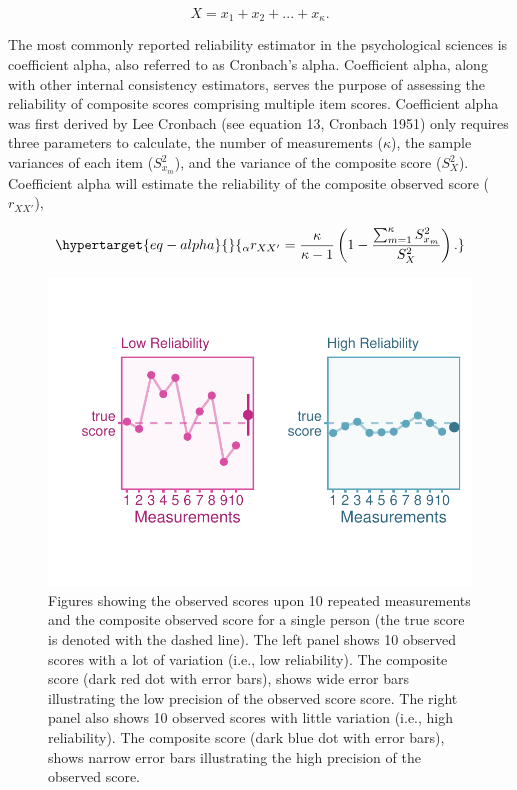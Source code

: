 \documentclass[
  letterpaper,
  DIV=11,
  numbers=noendperiod]{scrreprt}
\begin{document}
\[
X = x_1 + x_2 +...+x_\kappa.
\]

The most commonly reported reliability estimator in the psychological
sciences is coefficient alpha, also referred to as Cronbach's alpha.
Coefficient alpha, along with other internal consistency estimators,
serves the purpose of assessing the reliability of composite scores
comprising multiple item scores. Coefficient alpha was first derived by
Lee Cronbach (see equation 13, Cronbach 1951) only requires three
parameters to calculate, the number of measurements (\(\kappa\)), the
sample variances of each item (\(S^2_{x_m}\)), and the variance of the
composite score (\(S^2_{X}\)). Coefficient alpha will estimate the
reliability of the composite observed score (\(r_{XX'}\)),

\begin{equation}\protect\hypertarget{eq-alpha}{}{
_\alpha r_{XX'} = \frac{\kappa}{\kappa-1}\left( 1 - \frac{\sum_{m=1}^\kappa S^2_{x_m}}{S^2_{X}} \right).
}\label{eq-alpha}\end{equation}

\begin{figure}[H]

{\centering \includegraphics{unreliability_files/figure-pdf/unnamed-chunk-1-1.pdf}

}

\caption{Figures showing the observed scores upon 10 repeated
measurements and the composite observed score for a single person (the
true score is denoted with the dashed line). The left panel shows 10
observed scores with a lot of variation (i.e., low reliability). The
composite score (dark red dot with error bars), shows wide error bars
illustrating the low precision of the observed score score. The right
panel also shows 10 observed scores with little variation (i.e., high
reliability). The composite score (dark blue dot with error bars), shows
narrow error bars illustrating the high precision of the observed
score.}

\end{figure}
\end{document}

